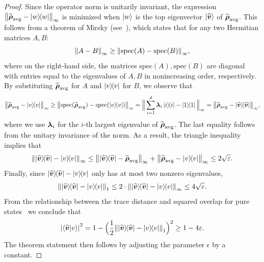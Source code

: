 \documentclass{article}
\begin{document}
\begin{proof}
    Since the operator norm is unitarily invariant, the expression $\norm{\widehat{\boldsymbol{\rho}}_{\mathrm{avg}} - \ketbra{w}}_{\infty}$ is minimized when $\ket{w}$ is the top eigenvector $\ket{\widehat{\boldsymbol{v}}}$ of $\widehat{\boldsymbol{\rho}}_{\mathrm{avg}}$. This follows from a theorem of Mirsky (see~\cite[Corollary 7.4.9.3]{HJ13}), which states that for any two Hermitian matrices $A, B$:
    \begin{equation*}
        \norm{A - B}_{\infty} \geq \norm{\mathrm{spec}(A) - \mathrm{spec}(B)}_{\infty},
    \end{equation*}
    where on the right-hand side, the matrices $\mathrm{spec}(A), \mathrm{spec}(B)$ are diagonal with entries equal to the eigenvalues of $A,B$ in nonincreasing order, respectively. By substituting $\widehat{\boldsymbol{\rho}}_{\mathrm{avg}}$ for $A$ and $\ketbra{v}$ for $B$, we observe that
    \begin{equation*}
        \norm{\widehat{\boldsymbol{\rho}}_{\mathrm{avg}} - \ketbra{v}}_{\infty} \geq 
        \norm{\mathrm{spec}(\widehat{\boldsymbol{\rho}}_{\mathrm{avg}}) - \mathrm{spec}(\ketbra{v})}_{\infty}
        =
        \Big\lVert \sum_{i=1}^d \boldsymbol{\lambda}_i \ketbra{i} - \ketbra{1}\Big\rVert_{\infty}
        =
        \norm{\widehat{\boldsymbol{\rho}}_{\mathrm{avg}} - \ketbra{\widehat{\boldsymbol{v}}}}_{\infty},
    \end{equation*}
    where we use $\boldsymbol{\lambda}_i$ for the $i$-th largest eigenvalue of $\widehat{\boldsymbol{\rho}}_{\mathrm{avg}}$. The last equality follows from the unitary invariance of the norm.
    As a result, the triangle inequality implies that
    \begin{equation*}
        \norm{\ketbra{\widehat{\boldsymbol{v}}} - \ketbra{v}}_{\infty}
        \leq \norm{\ketbra{\widehat{\boldsymbol{v}}} - \widehat{\boldsymbol{\rho}}_{\mathrm{avg}}}_{\infty}
        + \norm{\widehat{\boldsymbol{\rho}}_{\mathrm{avg}} - \ketbra{v}}_{\infty}
        \leq 2\sqrt{\varepsilon}.
    \end{equation*}
    Finally, since $\ketbra{\widehat{\boldsymbol{v}}} - \ketbra{v}$ only has at most two nonzero eigenvalues,
    \begin{equation*}
        \norm{\ketbra{\widehat{\boldsymbol{v}}} - \ketbra{v}}_1 \leq 2 \cdot \norm{\ketbra{\widehat{\boldsymbol{v}}} - \ketbra{v}}_{\infty} \leq 4\sqrt{\varepsilon}.
    \end{equation*}
    From the relationship between the trace distance and squared overlap for pure states~\cite[Eq.\ (1.186)]{Wat18} we conclude that
    \begin{equation*}
        \abs{\braket{\widehat{\boldsymbol{v}}}{v}}^2 = 1 - \Big(\frac{1}{2}\norm{\ketbra{\widehat{\boldsymbol{v}}} - \ketbra{v}}_1\Big)^2 \geq 1 - 4\varepsilon.
    \end{equation*}
    The theorem statement then follows by adjusting the parameter $\epsilon$ by a constant.
\end{proof}
\end{document}
